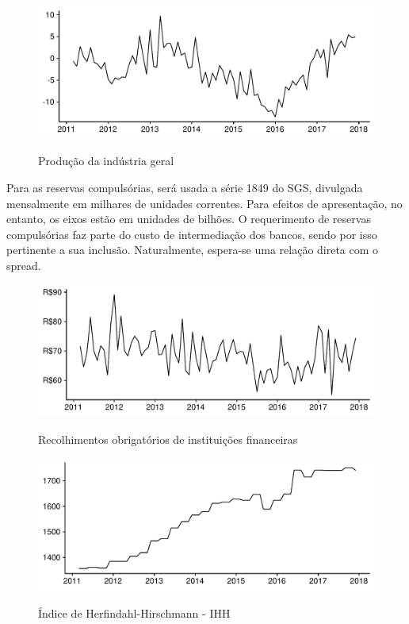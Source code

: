 \documentclass[a4paper, article, 12pt, openany, oneside, english, brazil]{abntex2}
\begin{document}
\begin{figure}[t]
  \centering
  \caption{Produção da indústria geral}
      \includegraphics[width = \textwidth, scale=0.75]{ProducaoIndustrial_IPEADATA.pdf}
      \label{prodind}
\end{figure}
    
    Para as reservas compulsórias, será usada a série 1849 do SGS, divulgada mensalmente em milhares de unidades correntes. Para efeitos de apresentação, no entanto, os eixos estão em unidades de bilhões. O requerimento de reservas compulsórias faz parte do custo de intermediação dos bancos, sendo por isso pertinente a sua inclusão. Naturalmente, espera-se uma relação direta com o spread.

\begin{figure}[h]
  \centering
  \caption{Recolhimentos obrigatórios de instituições financeiras}
      \includegraphics[width = \textwidth, scale=0.75]{Compulsorio.pdf}
      \label{comp}
\end{figure}
    

\begin{figure}[h]
  \centering
  \caption{Índice de Herfindahl-Hirschmann - IHH}
      \includegraphics[width = \textwidth, scale=0.75]{IHH.pdf}
      \label{ihh}
\end{figure}
    
\end{document}
